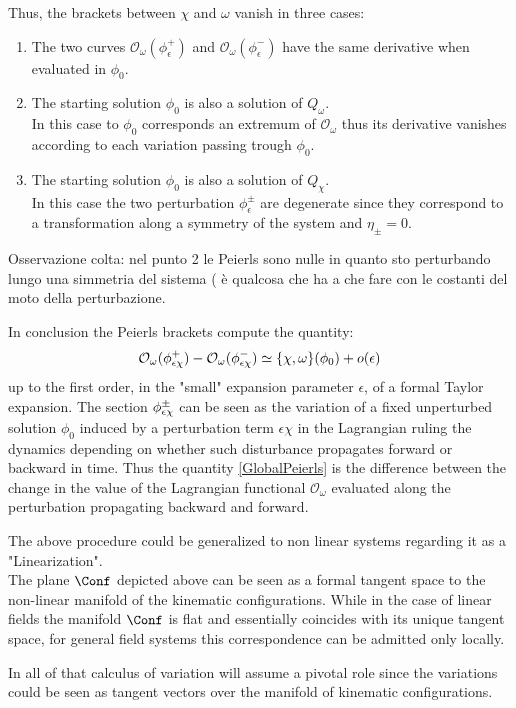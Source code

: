 \documentclass[Main]{subfiles}
\begin{document}
		Thus, the brackets between $\chi$ and $\omega$ vanish in three cases:
		\begin{enumerate}
			\item The two curves $\mathcal{O}_\omega ( \phi_\epsilon^+)$ and $\mathcal{O}_\omega ( \phi_\epsilon^-)$ have the same derivative when evaluated in $\phi_0$.
			\item The starting solution $\phi_0$ is also a solution of $Q_\omega$.\\
				In this case to $\phi_0$ corresponds an extremum of $\mathcal{O}_\omega$ thus its derivative vanishes according to each variation passing trough $\phi_0$.
			\item The starting solution $\phi_0$ is also a solution of $Q_\chi$.\\
				In this case the two perturbation $\phi_\epsilon^\pm$ are degenerate since they correspond to a transformation along a symmetry of the system and $ \eta_\pm = 0$.
		\end{enumerate}
\ifToninus
		\begin{Warning}
			Osservazione colta: nel punto 2 le Peierls sono nulle in quanto sto perturbando lungo una simmetria del sistema ( è qualcosa che ha a che fare con le costanti del moto della perturbazione.
		\end{Warning}
\fi
		
		In conclusion the Peierls brackets compute the quantity:
		\begin{equation}\label{GlobalPeierls}
			\mathcal{O}_\omega ( \phi_{\tiny \epsilon\chi}^+)  - \mathcal{O}_\omega ( \phi_{\tiny \epsilon\chi}^-) \simeq  \{\chi, \omega \}(\phi_0)  + o(\epsilon)
		\end{equation}
		up to the first order, in the \ifToninus "small" \fi expansion parameter $\epsilon$, of a formal Taylor expansion.
		The section $\phi_{\tiny \epsilon\chi}^\pm$ can be seen as the variation of a fixed unperturbed solution $\phi_0$ induced by a perturbation term $\epsilon \chi$ in the Lagrangian ruling the dynamics depending on whether such disturbance propagates forward or backward in time.
		Thus the  quantity \ref{GlobalPeierls} is the difference between the change in the value of the Lagrangian functional $\mathcal{O}_\omega$ evaluated along  the perturbation propagating backward and forward.
		
		\begin{remark}
		The above procedure could be generalized to non linear systems regarding it as a "Linearization".\\
		The plane $\Conf$ depicted above can be seen as a formal tangent space to the non-linear manifold of the kinematic configurations.
		While in the case of linear fields the manifold $\Conf$ is flat and essentially coincides with its unique tangent space, for general field systems  this correspondence can be admitted only locally.
		\end{remark}		
\ifToninus
	\begin{Warning}
				In all of that calculus of variation will assume a pivotal role since the variations could be seen as tangent vectors over the manifold of  kinematic configurations.
	\end{Warning}
\fi	
		
\end{document}
